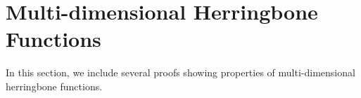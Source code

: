 \documentclass[11pt]{article}
\begin{document}
\begin{comment}
    By the condition on $p$ in the lemma statement, we have $P_0 \leq \log_2(p)$. Applying Markov's inequality and inequality \eqref{eq:telescope_result} gives 
    \begin{align}
        \Pr [P_T \geq 0] &\leq \Pr [P_T - P_0 \geq \log_2(1/p)] \leq \frac{T \log_2(|Y|)}{\log_2(1/p)}\,. \label{eq:pt-positive-probability-small} %
    \end{align}
    If $\mathcal{A}$ queries an $i$ such that $f_i(X) = \bot$ within $T$ queries, then $P_T = \log_2(1) = 0$. Therefore, the probability in \eqref{eq:pt-positive-probability-small} upper-bounds the success probability of $\mathcal{A}$, which completes the proof.
    
\end{proof}

\end{comment}





\appendix 

\section{Multi-dimensional Herringbone Functions} \label{app:properties_herringbone_functions}

In this section, we include several proofs showing  properties of multi-dimensional herringbone functions.
\end{document}
